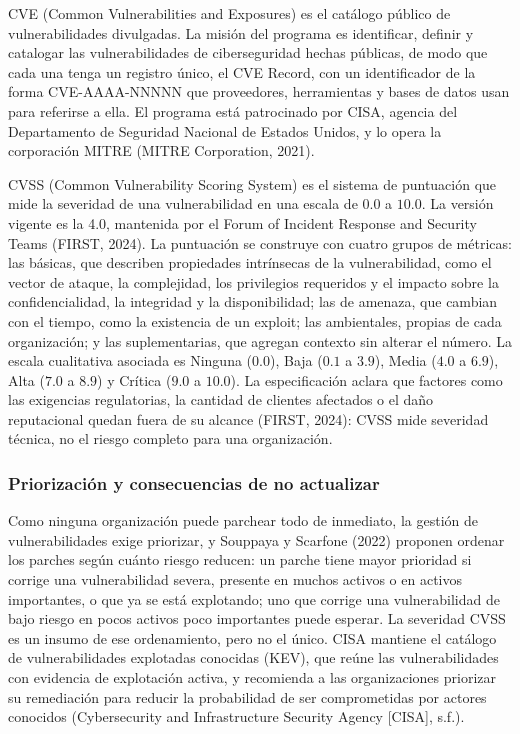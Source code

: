 CVE (Common Vulnerabilities and Exposures) es el catálogo público de vulnerabilidades
divulgadas. La misión del programa es identificar, definir y catalogar las vulnerabilidades de
ciberseguridad hechas públicas, de modo que cada una tenga un registro único, el CVE Record,
con un identificador de la forma CVE-AAAA-NNNNN que proveedores, herramientas y bases de datos
usan para referirse a ella. El programa está patrocinado por CISA, agencia del
Departamento de Seguridad Nacional de Estados Unidos, y lo opera la corporación MITRE (MITRE
Corporation, 2021).

CVSS (Common Vulnerability Scoring System) es el sistema de puntuación que mide la severidad de
una vulnerabilidad en una escala de $0.0$ a $10.0$. La versión vigente es la 4.0, mantenida por
el Forum of Incident Response and Security Teams (FIRST, 2024). La puntuación se construye con
cuatro grupos de métricas: las básicas, que describen propiedades intrínsecas de la
vulnerabilidad, como el vector de ataque, la complejidad, los privilegios requeridos y el
impacto sobre la confidencialidad, la integridad y la disponibilidad; las de amenaza, que
cambian con el tiempo, como la existencia de un exploit; las ambientales, propias de cada
organización; y las suplementarias, que agregan contexto sin alterar el número. La escala
cualitativa asociada es Ninguna ($0.0$), Baja ($0.1$ a $3.9$), Media ($4.0$ a $6.9$), Alta
($7.0$ a $8.9$) y Crítica ($9.0$ a $10.0$). La especificación aclara que factores como las
exigencias regulatorias, la cantidad de clientes afectados o el daño reputacional quedan fuera
de su alcance (FIRST, 2024): CVSS mide severidad técnica, no el riesgo completo para una
organización.

\subsubsection{Priorización y consecuencias de no actualizar}
\label{subsubsec:priorizacion}

Como ninguna organización puede parchear todo de inmediato, la gestión de vulnerabilidades
exige priorizar, y Souppaya y Scarfone (2022) proponen ordenar los parches según cuánto riesgo
reducen: un parche tiene mayor prioridad si corrige una vulnerabilidad severa, presente en
muchos activos o en activos importantes, o que ya se está explotando; uno que corrige una
vulnerabilidad de bajo riesgo en pocos activos poco importantes puede esperar. La severidad
CVSS es un insumo de ese ordenamiento, pero no el único. CISA mantiene el catálogo de
vulnerabilidades explotadas conocidas (KEV), que reúne las vulnerabilidades con evidencia de
explotación activa, y recomienda a las organizaciones priorizar su remediación para reducir la
probabilidad de ser comprometidas por actores conocidos (Cybersecurity and Infrastructure
Security Agency [CISA], s.f.).

